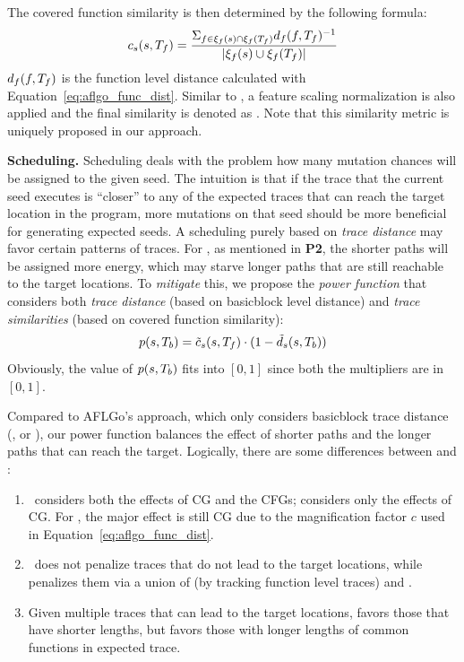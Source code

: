 The covered function similarity is then determined by the following formula:
{\myeqsize\begin{equation}
c_s(s, T_f) = \frac{\Sigma_{f\in\xi_f(s)	\cap\xi_f(T_f)}d_f(f,T_f)^{-1}}{|\xi_f(s)\cup\xi_f(T_f)|}
\end{equation}}
$d_f(f,T_f)$ is the function level distance calculated with Equation~\ref{eq:aflgo_func_dist}. Similar to \traceDistn, a feature scaling normalization is also applied and the final similarity is denoted as \covDistnN. Note that this similarity metric is uniquely proposed in our approach.

\textbf{Scheduling.}
Scheduling deals with the problem how many mutation chances will be assigned to the given seed. The intuition is that if the trace that the current seed executes is ``closer'' to any of the expected traces that can reach the target location in the program, more mutations on that seed should be more beneficial for generating expected seeds. A scheduling purely based on \emph{trace distance} may favor certain patterns of traces. For \aflgo, as mentioned in \textbf{P2}, the shorter paths will be assigned more energy, which may starve longer paths that are still reachable to the target locations. To \emph{mitigate} this, we propose the \emph{power function} that considers both \emph{trace distance} (based on basicblock level distance) and \emph{trace similarities} (based on covered function similarity): 
{\myeqsize\begin{equation}\label{eq:aflgo_power}
p(s, T_b) = \tilde{c}_{s}(s, T_f)\cdot(1 - \tilde{d}_s(s,T_b))
\end{equation}}
Obviously, the value of $p(s, T_b)$ fits into $[0,1]$ since both the multipliers are in $[0,1]$.

Compared to AFLGo's approach, which only considers basicblock trace distance (\traceDistn, or \traceDistnFinal), our power function balances the effect of shorter paths and the longer paths that can reach the target. Logically, there are some differences between {\covDistn} and {\traceDistn}:
\begin{enumerate}[(1)]
    \item \traceDistn~considers both the effects of CG and the CFGs; {\covDistn} considers only the effects of CG. For \traceDistn, the major effect is still CG due to the magnification factor $c$ used in Equation~\ref{eq:aflgo_func_dist}.
    \item \traceDistn~does not penalize traces that do not lead to the target locations, while {\covDistn} penalizes them via a union of  (by tracking function level traces) and \fntrace{\tgtfnset}.
    \item Given multiple traces that can lead to the target locations, {\traceDistn} favors those that have shorter lengths, but {\covDistn} favors those with longer lengths of common functions in expected trace.
\end{enumerate}

